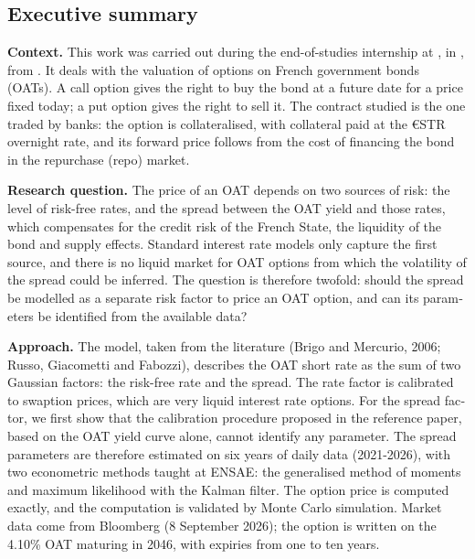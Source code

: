 \begin{otherlanguage}{english}
\section*{Executive summary}

\textbf{Context.} This work was carried out during the end-of-studies internship at
, in , from . It deals with the valuation of options on
French government bonds (OATs). A call option gives the right to buy the bond at a future date for a price fixed
today; a put option gives the right to sell it. The contract studied is the one traded by banks: the option is
collateralised, with collateral paid at the €STR overnight rate, and its forward price follows from the cost of
financing the bond in the repurchase (repo) market.

\textbf{Research question.} The price of an OAT depends on two sources of risk: the level of risk-free rates, and
the spread between the OAT yield and those rates, which compensates for the credit risk of the French State, the
liquidity of the bond and supply effects. Standard interest rate models only capture the first source, and there
is no liquid market for OAT options from which the volatility of the spread could be inferred. The question is
therefore twofold: should the spread be modelled as a separate risk factor to price an OAT option, and can its
parameters be identified from the available data?

\textbf{Approach.} The model, taken from the literature (Brigo and Mercurio, 2006; Russo, Giacometti and Fabozzi),
describes the OAT short rate as the sum of two Gaussian factors: the risk-free rate and the spread. The rate factor
is calibrated to swaption prices, which are very liquid interest rate options. For the spread factor, we first
show that the calibration procedure proposed in the reference paper, based on the OAT yield curve alone, cannot
identify any parameter. The spread parameters are therefore estimated on six years of daily data (2021-2026),
with two econometric methods taught at ENSAE: the generalised method of moments and maximum likelihood with the
Kalman filter. The option price is computed exactly, and the computation is validated by Monte Carlo simulation.
Market data come from Bloomberg (8 September 2026); the option is written on the 4.10\% OAT maturing in 2046, with
expiries from one to ten years.


\end{otherlanguage}
